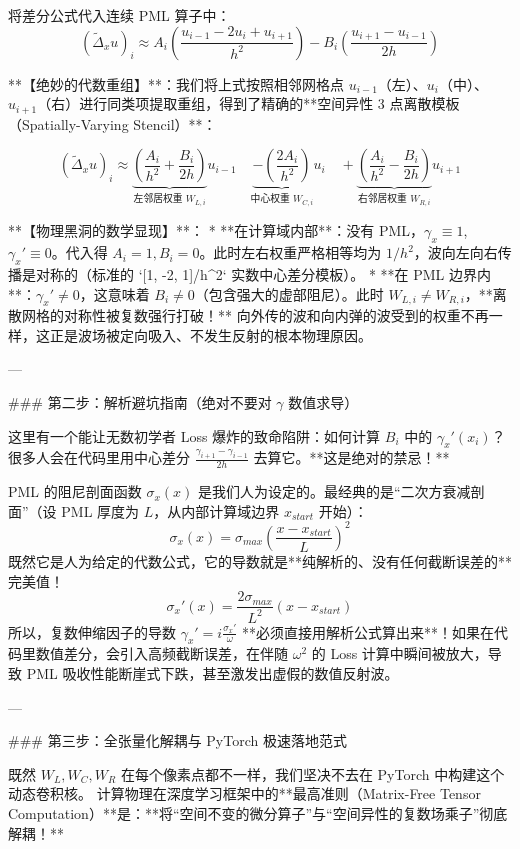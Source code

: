 \documentclass[12pt]{article}
\begin{document}
{将差分公式代入连续 PML 算子中：
$$ (\tilde{\Delta}_x u)_i \approx A_i \left( \frac{u_{i-1} - 2u_i + u_{i+1}}{h^2} \right) - B_i \left( \frac{u_{i+1} - u_{i-1}}{2h} \right) $$

**【绝妙的代数重组】**：我们将上式按照相邻网格点 $u_{i-1}$（左）、$u_i$（中）、$u_{i+1}$（右）进行同类项提取重组，得到了精确的**空间异性 3 点离散模板（Spatially-Varying Stencil）**：

$$ (\tilde{\Delta}_x u)_i \approx \underbrace{\left( \frac{A_i}{h^2} + \frac{B_i}{2h} \right)}_{\text{左邻居权重 } W_{L,i}} u_{i-1} \quad \underbrace{- \left( \frac{2A_i}{h^2} \right)}_{\text{中心权重 } W_{C,i}} u_i \quad + \underbrace{\left( \frac{A_i}{h^2} - \frac{B_i}{2h} \right)}_{\text{右邻居权重 } W_{R,i}} u_{i+1} $$

**【物理黑洞的数学显现】**：
* **在计算域内部**：没有 PML，$\gamma_x \equiv 1$, $\gamma_x' \equiv 0$。代入得 $A_i = 1, B_i = 0$。此时左右权重严格相等均为 $1/h^2$，波向左向右传播是对称的（标准的 `[1, -2, 1]/h^2` 实数中心差分模板）。
* **在 PML 边界内**：$\gamma_x' \neq 0$，这意味着 $B_i \neq 0$（包含强大的虚部阻尼）。此时 $W_{L,i} \neq W_{R,i}$，**离散网格的对称性被复数强行打破！** 向外传的波和向内弹的波受到的权重不再一样，这正是波场被定向吸入、不发生反射的根本物理原因。

---

### 第二步：解析避坑指南（绝对不要对 $\gamma$ 数值求导）

这里有一个能让无数初学者 Loss 爆炸的致命陷阱：如何计算 $B_i$ 中的 $\gamma_x'(x_i)$？
很多人会在代码里用中心差分 $\frac{\gamma_{i+1} - \gamma_{i-1}}{2h}$ 去算它。**这是绝对的禁忌！**

PML 的阻尼剖面函数 $\sigma_x(x)$ 是我们人为设定的。最经典的是“二次方衰减剖面”（设 PML 厚度为 $L$，从内部计算域边界 $x_{start}$ 开始）：
$$ \sigma_x(x) = \sigma_{max} \left( \frac{x - x_{start}}{L} \right)^2 $$
既然它是人为给定的代数公式，它的导数就是**纯解析的、没有任何截断误差的**完美值！
$$ \sigma_x'(x) = \frac{2 \sigma_{max}}{L^2} (x - x_{start}) $$
所以，复数伸缩因子的导数 $\gamma_x' = i \frac{\sigma_x'}{\omega}$ **必须直接用解析公式算出来**！如果在代码里数值差分，会引入高频截断误差，在伴随 $\omega^2$ 的 Loss 计算中瞬间被放大，导致 PML 吸收性能断崖式下跌，甚至激发出虚假的数值反射波。

---

### 第三步：全张量化解耦与 PyTorch 极速落地范式

既然 $W_L, W_C, W_R$ 在每个像素点都不一样，我们坚决不去在 PyTorch 中构建这个动态卷积核。
计算物理在深度学习框架中的**最高准则（Matrix-Free Tensor Computation）**是：**将“空间不变的微分算子”与“空间异性的复数场乘子”彻底解耦！**

}
\end{document}
